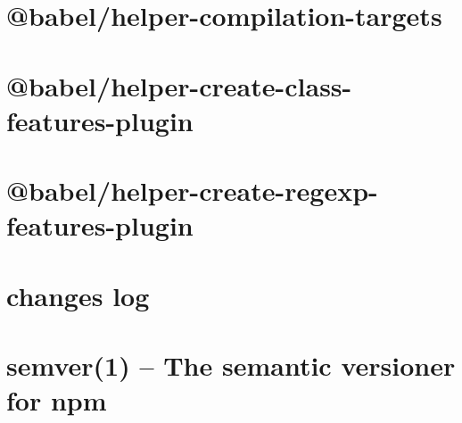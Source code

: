 \documentclass[twoside]{book}
\newcommand{\+}{\discretionary{\mbox{\scriptsize$\hookleftarrow$}}{}{}}
\begin{document}
\chapter{@babel/helper-\/compilation-\/targets}
\label{md__c___users_vaishnavi_jadhav__desktop__developer_code_mean_stack_example_client_node_modules__b61bf13faee541ce6586d94941ad0f44}

\chapter{@babel/helper-\/create-\/class-\/features-\/plugin}
\label{md__c___users_vaishnavi_jadhav__desktop__developer_code_mean_stack_example_client_node_modules__7c99b2eab2a9d7ac4dccd034e5320fd2}

\chapter{@babel/helper-\/create-\/regexp-\/features-\/plugin}
\label{md__c___users_vaishnavi_jadhav__desktop__developer_code_mean_stack_example_client_node_modules__3cdfbdd13223589a47108e2ae3efcb50}

\chapter{changes log}
\label{md__c___users_vaishnavi_jadhav__desktop__developer_code_mean_stack_example_client_node_modules__9071ee363b4d902813f27b9d02fb2454}

\chapter{semver(1) -- The semantic versioner for npm}
\label{md__c___users_vaishnavi_jadhav__desktop__developer_code_mean_stack_example_client_node_modules__8d59a146c9c20c05b2fb1fc47474d136}

\end{document}
